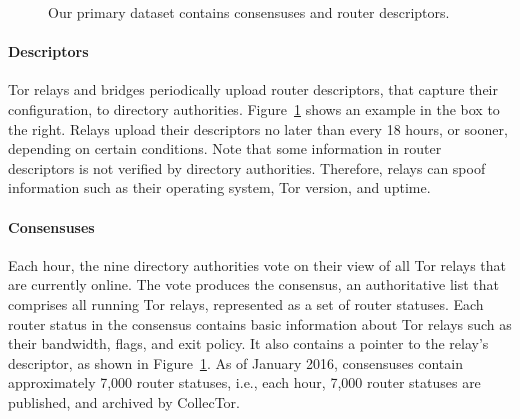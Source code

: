 \begin{figure}[t]
\caption{Our primary dataset contains consensuses and router descriptors.}
\label{fig:datasets}
\end{figure}

\paragraph{Descriptors} Tor relays and bridges periodically upload router
descriptors, that capture their configuration, to directory authorities.
Figure~\ref{fig:datasets} shows an example in the box to the right.  Relays
upload their descriptors no later than every 18 hours, or sooner, depending on
certain conditions.  Note that some information in router descriptors is not
verified by directory authorities.  Therefore, relays can spoof information such
as their operating system, Tor version, and uptime.

\paragraph{Consensuses} Each hour, the nine directory authorities vote on their
view of all Tor relays that are currently online.  The vote produces the
consensus, an authoritative list that comprises all running Tor relays,
represented as a set of router statuses.  Each router status in the consensus
contains basic information about Tor relays such as their bandwidth, flags, and
exit policy.  It also contains a pointer to the relay's descriptor, as shown in
Figure~\ref{fig:datasets}.  As of January 2016, consensuses contain approximately
7,000 router statuses, i.e., each hour, 7,000 router statuses are published, and
archived by CollecTor.

